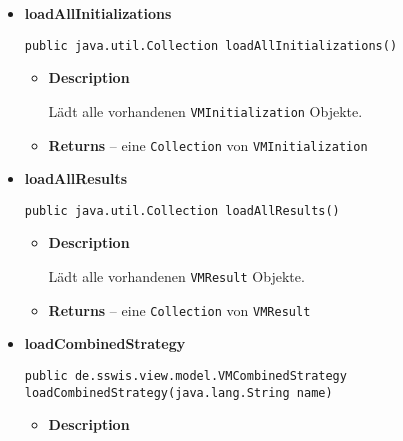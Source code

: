 {{{{{{\begin{itemize}
{\begin{itemize}
{Lädt alle vorhandenen \texttt{\small VMGame} Objekte.
}
\item{{\bf  Returns} -- 
eine \texttt{\small Collection} von \texttt{\small VMGame} 
}%
\end{itemize}
}%
\item{ 
\hypertarget{de.sswis.controller.FileManager.loadAllInitializations()}{{\bf  loadAllInitializations}\\}
\begin{lstlisting}[frame=none]
public java.util.Collection loadAllInitializations()\end{lstlisting} %
\begin{itemize}
\item{
{\bf  Description}

Lädt alle vorhandenen \texttt{\small VMInitialization} Objekte.
}
\item{{\bf  Returns} -- 
eine \texttt{\small Collection} von \texttt{\small VMInitialization} 
}%
\end{itemize}
}%
\item{ 
\hypertarget{de.sswis.controller.FileManager.loadAllResults()}{{\bf  loadAllResults}\\}
\begin{lstlisting}[frame=none]
public java.util.Collection loadAllResults()\end{lstlisting} %
\begin{itemize}
\item{
{\bf  Description}

Lädt alle vorhandenen \texttt{\small VMResult} Objekte.
}
\item{{\bf  Returns} -- 
eine \texttt{\small Collection} von \texttt{\small VMResult} 
}%
\end{itemize}
}%
\item{ 
\hypertarget{de.sswis.controller.FileManager.loadCombinedStrategy(java.lang.String)}{{\bf  loadCombinedStrategy}\\}
\begin{lstlisting}[frame=none]
public de.sswis.view.model.VMCombinedStrategy loadCombinedStrategy(java.lang.String name)\end{lstlisting} %
\begin{itemize}
\item{
{\bf  Description}

}
\end{itemize}}
\end{itemize}}}}}}}
